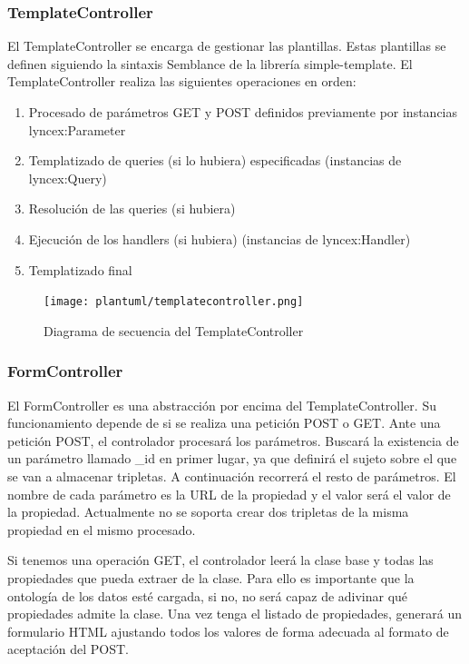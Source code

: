 \documentclass[12pt]{report} %
\begin{document}
\subsubsection{TemplateController}
El TemplateController se encarga de gestionar las plantillas. Estas plantillas se definen siguiendo la sintaxis Semblance de la librería simple-template.
El TemplateController realiza las siguientes operaciones en orden:
\begin{enumerate}
    \item Procesado de parámetros GET y POST definidos previamente por instancias lyncex:Parameter
    \item Templatizado de queries (si lo hubiera) especificadas (instancias de lyncex:Query)
    \item Resolución de las queries (si hubiera)
    \item Ejecución de los handlers (si hubiera) (instancias de lyncex:Handler)
    \item Templatizado final
\end{enumerate}

\begin{figure}
    \centering
    \texttt{[image: plantuml/templatecontroller.png]}
    \caption{Diagrama de secuencia del TemplateController}
    \label{fig:templatecontroller}
\end{figure}

\subsubsection{FormController}
El FormController es una abstracción por encima del TemplateController.
Su funcionamiento depende de si se realiza una petición POST o GET. Ante una petición POST, el controlador procesará los parámetros.
Buscará la existencia de un parámetro llamado \_id en primer lugar, ya que definirá el sujeto sobre el que se van a almacenar tripletas.
A continuación recorrerá el resto de parámetros. El nombre de cada parámetro es la URL de la propiedad y el valor será el valor de la propiedad.
Actualmente no se soporta crear dos tripletas de la misma propiedad en el mismo procesado.

Si tenemos una operación GET, el controlador leerá la clase base y todas las propiedades que pueda extraer de la clase. Para ello es importante que la ontología de los datos esté cargada, si no, no será capaz de adivinar qué propiedades admite la clase.
Una vez tenga el listado de propiedades, generará un formulario HTML ajustando todos los valores de forma adecuada al formato de aceptación del POST.
\end{document}
